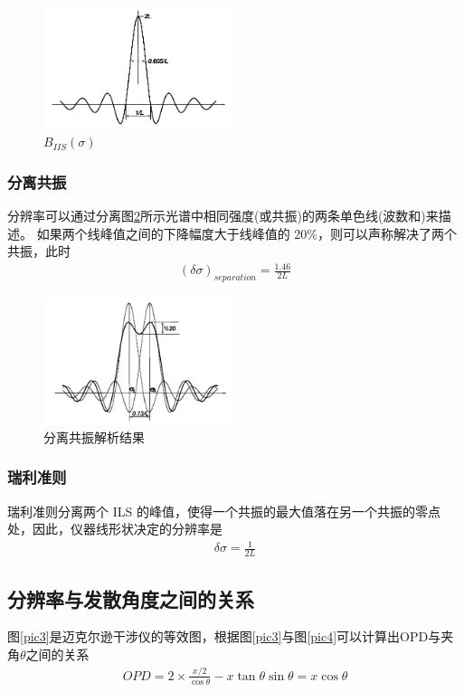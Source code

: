 \documentclass[conference]{IEEEtran}
\begin{document}
\begin{figure}[htbp]
    \centerline{\includegraphics[width=0.5\textwidth]{pic1.png}}
    \caption{$B_{I I S}(\sigma)$}
    \label{pic1}
\end{figure}

\subsubsection{分离共振}
分辨率可以通过分离图\ref{pic2}所示光谱中相同强度(或共振)的两条单色线(波数和)来描述。
如果两个线峰值之间的下降幅度大于线峰值的 20\%，则可以声称解决了两个共振，此时
\begin{align}
    (\delta \sigma)_{separation} = \frac{1.46}{2L}
\end{align}

\begin{figure}[htbp]
    \centerline{\includegraphics[width=0.5\textwidth]{pic2.png}}
    \caption{分离共振解析结果}
    \label{pic2}
\end{figure}

\subsubsection{瑞利准则}
瑞利准则分离两个 ILS 的峰值，使得一个共振的最大值落在另一个共振的零点处，因此，仪器线形状决定的分辨率是
\begin{align}
    \delta \sigma = \frac{1}{2L}    \label{eq2}
\end{align} 

\subsection{分辨率与发散角度之间的关系}
图\ref{pic3}是迈克尔逊干涉仪的等效图，根据图\ref{pic3}与图\ref{pic4}可以计算出OPD与夹角$\theta$之间的关系
\begin{align}
    O P D=2 \times \frac{x / 2}{\cos \theta}-x \tan \theta \sin \theta=x \cos \theta
\end{align}
\end{document}
